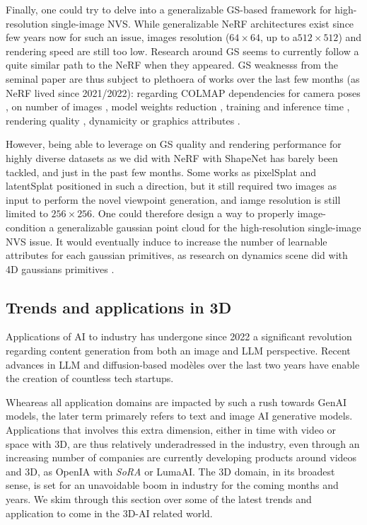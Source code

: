 Finally, one could try to delve into a generalizable \ac{GS}-based framework for high-resolution single-image \ac{NVS}. While generalizable \ac{NeRF} architectures exist since few years now \citep{yu2021pixelnerf,li2022symmnerf,lin2023vision} for such an issue, images resolution ($64\times 64$, up to a$512\times 512$) and rendering speed are still too low. Research around \ac{GS} seems to currently follow a quite similar path to the \ac{NeRF} when they appeared. \ac{GS} weaknesss from the seminal paper \citep{kerbl20233d} are thus subject to plethoera of works over the last few months (as \ac{NeRF} lived since 2021/2022): regarding COLMAP dependencies for camera poses \citep{fu2023colmapfree}, on number of images \citep{xiong2023sparsegs,yang2024gaussianobject}, model weights reduction \citep{niedermayr2023compressed}, training and inference time \citep{fan2024instantsplat}, rendering quality \citep{yu2023mip} , dynamicity \citep{luiten2023dynamic} or graphics attributes \citep{wu2024deferredgs}.  

However, being able to leverage on \ac{GS} quality and rendering performance for highly diverse datasets as we did with NeRF \citep{landreau2024epinerf} with ShapeNet \citep{chang2015shapenet} has barely been tackled, and just in the past few months. Some works as pixelSplat and latentSplat positioned in such a direction, but it still required two images as input to perform the novel viewpoint generation, and iamge resolution is still limited to $256\times 256$. One could therefore design a way to properly image-condition a generalizable gaussian point cloud for the high-resolution single-image \ac{NVS} issue. It would eventually induce to increase the number of learnable attributes for each gaussian primitives, as research on dynamics scene did with 4D gaussians primitives \citep{luiten2023dynamic,gao2024gaussianflow}.  


\subsection{Trends and applications in 3D}
Applications of \ac{AI} to industry has undergone since 2022 a significant revolution regarding content generation from both an image and \ac{LLM} perspective. Recent advances in \ac{LLM} and diffusion-based modèles over the last two years have enable the creation of countless tech startups. 

Wheareas all application domains are impacted by such a rush towards \ac{GenAI} models, the later term primarely refers to text and image \ac{AI} generative models. Applications that involves this extra dimension, either in time with video or space with 3D, are thus relatively underadressed in the industry, even through an increasing number of companies are currently developing products around videos and 3D, as OpenIA with \textit{SoRA} or LumaAI. The 3D domain, in its broadest sense, is set for an unavoidable boom in industry for the coming months and years. We skim through this section over some of the latest trends and application to come in the 3D-\ac{AI} related world. 


